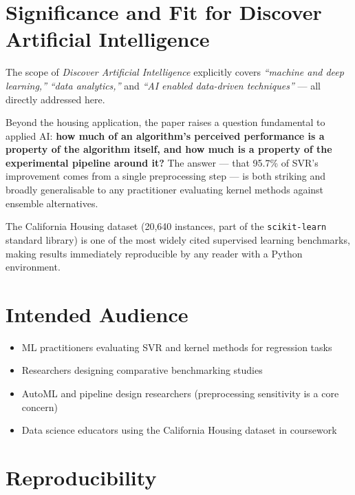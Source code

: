 \documentclass[12pt,a4paper]{article}
\begin{document}
\section{Significance and Fit for Discover Artificial Intelligence}

The scope of \textit{Discover Artificial Intelligence} explicitly covers
\emph{``machine and deep learning,''} \emph{``data analytics,''} and
\emph{``AI enabled data-driven techniques''} --- all directly addressed here.

Beyond the housing application, the paper raises a question fundamental to applied AI:
\textbf{how much of an algorithm's perceived performance is a property of the algorithm
itself, and how much is a property of the experimental pipeline around it?} The answer
--- that 95.7\% of SVR's improvement comes from a single preprocessing step --- is
both striking and broadly generalisable to any practitioner evaluating kernel methods
against ensemble alternatives.

The California Housing dataset (20,640 instances, part of the \texttt{scikit-learn}
standard library) is one of the most widely cited supervised learning benchmarks,
making results immediately reproducible by any reader with a Python environment.

\section{Intended Audience}

\begin{itemize}[leftmargin=1.8em]
  \item ML practitioners evaluating SVR and kernel methods for regression tasks
  \item Researchers designing comparative benchmarking studies
  \item AutoML and pipeline design researchers (preprocessing sensitivity is a
        core concern)
  \item Data science educators using the California Housing dataset in coursework
\end{itemize}

\section{Reproducibility}
\end{document}
